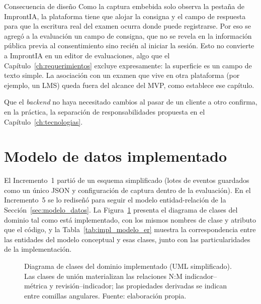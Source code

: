 \begin{keyfinding}{Consecuencia de diseño}
Como la captura embebida solo observa la pestaña de ImprontIA, la plataforma tiene que alojar la consigna y el campo de respuesta para que la escritura real del examen ocurra donde puede registrarse. Por eso se agregó a la evaluación un campo de consigna, que no se revela en la información pública previa al consentimiento sino recién al iniciar la sesión. Esto no convierte a ImprontIA en un editor de evaluaciones, algo que el Capítulo~\ref{ch:requerimientos} excluye expresamente: la superficie es un campo de texto simple. La asociación con un examen que vive en otra plataforma (por ejemplo, un LMS) queda fuera del alcance del MVP, como establece ese capítulo.
\end{keyfinding}

Que el \textit{backend} no haya necesitado cambios al pasar de un cliente a otro confirma, en la práctica, la separación de responsabilidades propuesta en el Capítulo~\ref{ch:tecnologias}.

\section{Modelo de datos implementado}
\label{sec:impl_modelo}

El Incremento~1 partió de un esquema simplificado (lotes de eventos guardados como un único JSON y configuración de captura dentro de la evaluación). En el Incremento~5 se lo rediseñó para seguir el modelo entidad-relación de la Sección~\ref{sec:modelo_datos}. La Figura~\ref{fig:diag_clases} presenta el diagrama de clases del dominio tal como está implementado, con los mismos nombres de clase y atributo que el código, y la Tabla~\ref{tab:impl_modelo_er} muestra la correspondencia entre las entidades del modelo conceptual y esas clases, junto con las particularidades de la implementación.

\begin{figure}[h!]
    \centering
    
    \caption[Diagrama de clases del dominio implementado]{Diagrama de clases del dominio implementado (UML simplificado). Las clases de unión materializan las relaciones N:M indicador--métrica y revisión--indicador; las propiedades derivadas se indican entre comillas angulares. Fuente: elaboración propia.}
    \label{fig:diag_clases}
\end{figure}

